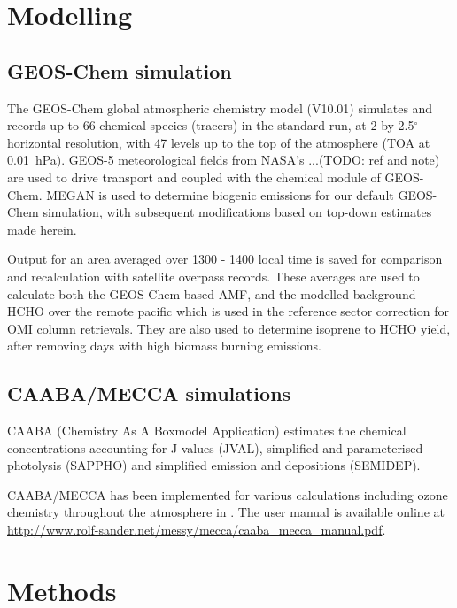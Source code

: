 \section{Modelling}
  \label{BioIsop:Model}
  
  \subsection{GEOS-Chem simulation}
    \label{BioIsop:Model:GC}
    The GEOS-Chem global atmospheric chemistry model (V10.01) simulates and records up to 66 chemical species (tracers) in the standard run, at 2 by 2.5$^{\circ}$ horizontal resolution, with 47 levels up to the top of the atmosphere (TOA at 0.01~hPa). 
    GEOS-5 meteorological fields from NASA's ...(TODO: ref and note) are used to drive transport and coupled with the chemical module of GEOS-Chem.
    MEGAN is used to determine biogenic emissions for our default GEOS-Chem simulation, with subsequent modifications based on top-down estimates made herein.
    
    Output for an area averaged over 1300 - 1400 local time is saved for comparison and recalculation with satellite overpass records.
    These averages are used to calculate both the GEOS-Chem based AMF, and the modelled background HCHO over the remote pacific which is used in the reference sector correction for OMI column retrievals.
    They are also used to determine isoprene to HCHO yield, after removing days with high biomass burning emissions.
  
  \subsection{CAABA/MECCA simulations}
    \label{BioIsop:Model:CM}
    
    CAABA (Chemistry As A Boxmodel Application) estimates the chemical concentrations accounting for J-values (JVAL), simplified and parameterised photolysis (SAPPHO) and simplified emission and depositions (SEMIDEP).
    
    CAABA/MECCA has been implemented for various calculations including ozone chemistry throughout the atmosphere in \cite{Zanis2014}.
    The user manual is available online at \url{http://www.rolf-sander.net/messy/mecca/caaba_mecca_manual.pdf}.
  
\section{Methods}
  \label{BioIsop:Methods}
  
